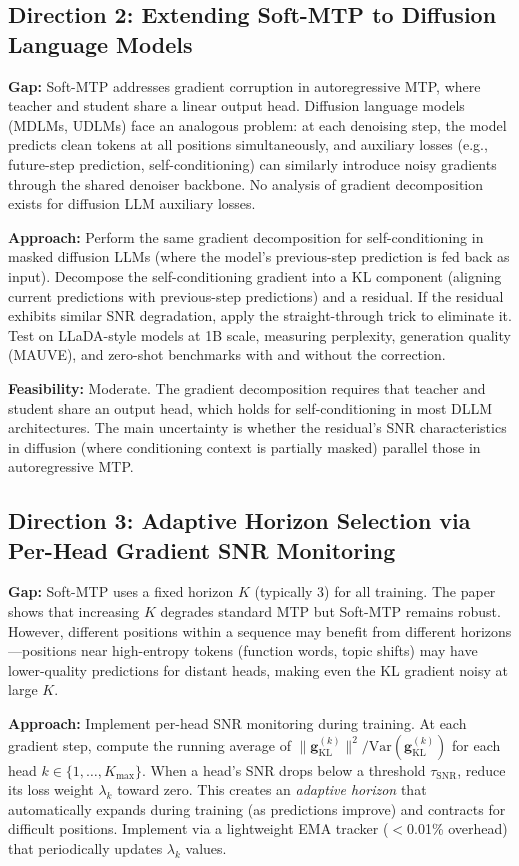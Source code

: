 \documentclass[11pt,a4paper]{article}
\begin{document}
\subsection{Direction 2: Extending Soft-MTP to Diffusion Language Models}
\textbf{Gap:} Soft-MTP addresses gradient corruption in autoregressive MTP, where teacher and student share a linear output head. Diffusion language models (MDLMs, UDLMs) face an analogous problem: at each denoising step, the model predicts clean tokens at all positions simultaneously, and auxiliary losses (e.g., future-step prediction, self-conditioning) can similarly introduce noisy gradients through the shared denoiser backbone. No analysis of gradient decomposition exists for diffusion LLM auxiliary losses.

\textbf{Approach:} Perform the same gradient decomposition for self-conditioning in masked diffusion LLMs (where the model's previous-step prediction is fed back as input). Decompose the self-conditioning gradient into a KL component (aligning current predictions with previous-step predictions) and a residual. If the residual exhibits similar SNR degradation, apply the straight-through trick to eliminate it. Test on LLaDA-style models at 1B scale, measuring perplexity, generation quality (MAUVE), and zero-shot benchmarks with and without the correction.

\textbf{Feasibility:} Moderate. The gradient decomposition requires that teacher and student share an output head, which holds for self-conditioning in most DLLM architectures. The main uncertainty is whether the residual's SNR characteristics in diffusion (where conditioning context is partially masked) parallel those in autoregressive MTP.

\subsection{Direction 3: Adaptive Horizon Selection via Per-Head Gradient SNR Monitoring}
\textbf{Gap:} Soft-MTP uses a fixed horizon $K$ (typically 3) for all training. The paper shows that increasing $K$ degrades standard MTP but Soft-MTP remains robust. However, different positions within a sequence may benefit from different horizons---positions near high-entropy tokens (function words, topic shifts) may have lower-quality predictions for distant heads, making even the KL gradient noisy at large $K$.

\textbf{Approach:} Implement per-head SNR monitoring during training. At each gradient step, compute the running average of $\|\mathbf{g}_{\mathrm{KL}}^{(k)}\|^2 / \mathrm{Var}(\mathbf{g}_{\mathrm{KL}}^{(k)})$ for each head $k \in \{1, \ldots, K_{\max}\}$. When a head's SNR drops below a threshold $\tau_{\mathrm{SNR}}$, reduce its loss weight $\lambda_k$ toward zero. This creates an \emph{adaptive horizon} that automatically expands during training (as predictions improve) and contracts for difficult positions. Implement via a lightweight EMA tracker ($<$0.01\% overhead) that periodically updates $\lambda_k$ values.
\end{document}
